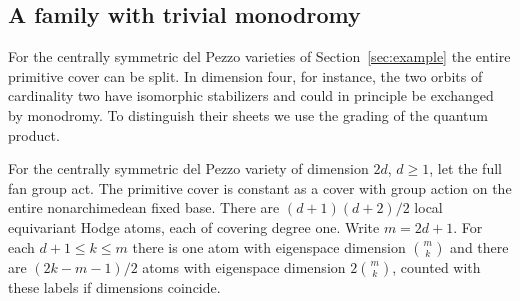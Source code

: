 \subsection{A family with trivial monodromy}\label{sec:centralatoms}
For the centrally symmetric del Pezzo varieties of Section~\ref{sec:example} the entire primitive cover can be split. In dimension four, for instance, the two orbits of cardinality two have isomorphic stabilizers and could in principle be exchanged by monodromy. To distinguish their sheets we use the grading of the quantum product.

\begin{proposition}\label{prop:centralatoms}
For the centrally symmetric del Pezzo variety of dimension $2d$, $d\ge1$, let the full fan group act. The primitive cover is constant as a cover with group action on the entire nonarchimedean fixed base. There are $(d+1)(d+2)/2$ local equivariant Hodge atoms, each of covering degree one. Write $m=2d+1$. For each $d+1\le k\le m$ there is one atom with eigenspace dimension $\binom{m}{k}$ and there are $(2k-m-1)/2$ atoms with eigenspace dimension $2\binom{m}{k}$, counted with these labels if dimensions coincide.
\end{proposition}
